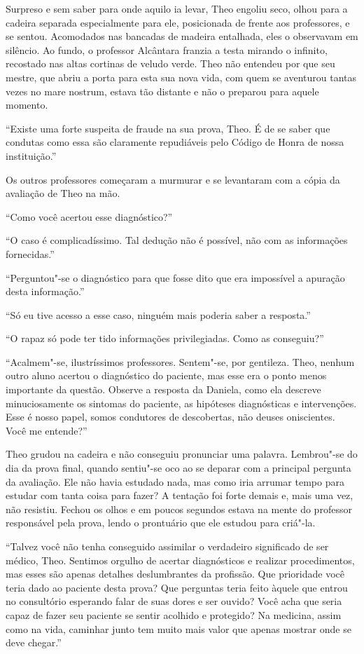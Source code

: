 Surpreso e sem saber para onde aquilo ia levar, Theo engoliu seco, olhou
para a cadeira separada especialmente para ele, posicionada de frente
aos professores, e se sentou. Acomodados nas bancadas de madeira
entalhada, eles o observavam em silêncio. Ao fundo, o professor
Alcântara franzia a testa mirando o infinito, recostado nas altas
cortinas de veludo verde. Theo não entendeu por que seu mestre, que abriu
a porta para esta sua nova vida, com quem se aventurou tantas vezes no mare
nostrum, estava tão distante e não o preparou para aquele momento.

``Existe uma forte suspeita de fraude na sua prova, Theo. É de se saber
que condutas como essa são claramente repudiáveis pelo Código de Honra
de nossa instituição.''

Os outros professores começaram a murmurar e se levantaram com a cópia
da avaliação de Theo na mão.

``Como você acertou esse diagnóstico?''

``O caso é complicadíssimo. Tal dedução não é possível, não com as
informações fornecidas.''

``Perguntou"-se o diagnóstico para que fosse dito que era impossível a
apuração desta informação.''

``Só eu tive acesso a esse caso, ninguém mais poderia saber a
resposta.''

``O rapaz só pode ter tido informações privilegiadas. Como as
conseguiu?''

``Acalmem"-se, ilustríssimos professores. Sentem"-se, por gentileza. Theo,
nenhum outro aluno acertou o diagnóstico do paciente, mas esse era o
ponto menos importante da questão. Observe a resposta da Daniela, como
ela descreve minuciosamente os sintomas do paciente, as hipóteses
diagnósticas e intervenções. Esse é nosso papel, somos condutores de
descobertas, não deuses oniscientes. Você me entende?''

Theo grudou na cadeira e não conseguiu pronunciar uma palavra.
Lembrou"-se do dia da prova final, quando sentiu"-se oco ao se deparar
com a principal pergunta da avaliação. Ele não havia estudado nada,
mas como iria arrumar tempo para estudar com tanta coisa para fazer?
A tentação foi forte demais e, mais uma vez, não resistiu. Fechou os
olhos e em poucos segundos estava na mente do professor responsável pela
prova, lendo o prontuário que ele estudou para criá"-la.

``Talvez você não tenha conseguido assimilar o verdadeiro significado de
ser médico, Theo. Sentimos orgulho de acertar diagnósticos e realizar
procedimentos, mas esses são apenas detalhes deslumbrantes da profissão.
Que prioridade você teria dado ao paciente desta prova? Que perguntas
teria feito àquele que entrou no consultório esperando falar de suas
dores e ser ouvido? Você acha que seria capaz de fazer seu paciente se
sentir acolhido e protegido? Na medicina, assim como na vida, caminhar
junto tem muito mais valor que apenas mostrar onde se deve chegar.''


